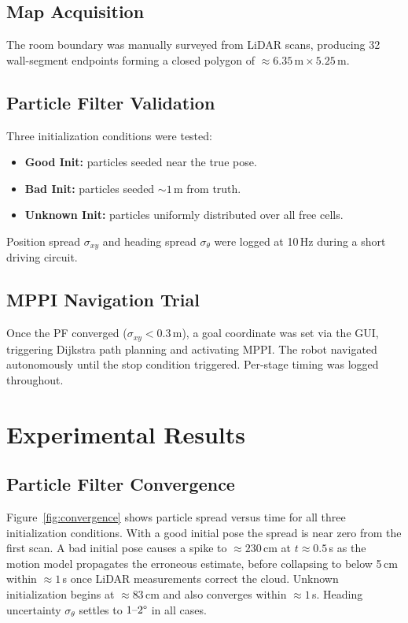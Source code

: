 \documentclass[conference]{IEEEtran}
\begin{document}
\subsection{Map Acquisition}
The room boundary was manually surveyed from LiDAR scans, producing 32 wall-segment endpoints forming a closed polygon of ${\approx}6.35\,\mathrm{m}\times5.25\,\mathrm{m}$.

\subsection{Particle Filter Validation}
Three initialization conditions were tested:
\begin{itemize}
    \item \textbf{Good Init:} particles seeded near the true pose.
    \item \textbf{Bad Init:} particles seeded ${\sim}1$\,m from truth.
    \item \textbf{Unknown Init:} particles uniformly distributed over all free cells.
\end{itemize}
Position spread $\sigma_{xy}$ and heading spread $\sigma_\theta$ were logged at 10\,Hz during a short driving circuit.

\subsection{MPPI Navigation Trial}
Once the PF converged ($\sigma_{xy}{<}0.3$\,m), a goal coordinate was set via the GUI, triggering Dijkstra path planning and activating MPPI. The robot navigated autonomously until the stop condition triggered. Per-stage timing was logged throughout.

\section{Experimental Results}
\label{sec:results}

\subsection{Particle Filter Convergence}

Figure~\ref{fig:convergence} shows particle spread versus time for all three initialization conditions. With a good initial pose the spread is near zero from the first scan. A bad initial pose causes a spike to ${\approx}230$\,cm at $t{\approx}0.5$\,s as the motion model propagates the erroneous estimate, before collapsing to below 5\,cm within ${\approx}1$\,s once LiDAR measurements correct the cloud. Unknown initialization begins at ${\approx}83$\,cm and also converges within ${\approx}1$\,s. Heading uncertainty $\sigma_\theta$ settles to $1\text{--}2\degree$ in all cases.
\end{document}
